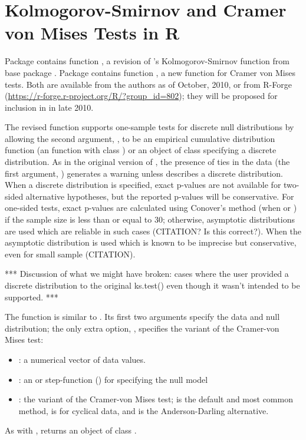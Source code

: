 \documentclass[article]{jss}
\begin{document}
\section{Kolmogorov-Smirnov and Cramer von Mises Tests in R}

Package  contains function , a revision of
's Kolmogorov-Smirnov function  from base
package .
Package  contains function , a new
function for Cramer von Mises tests.  Both are available from the authors
as of October, 2010,
or from R-Forge (\url{https://r-forge.r-project.org/R/?group_id=802});
they will be proposed for inclusion in  in late 2010.

The revised  function supports one-sample tests for discrete
null distributions by allowing the second argument, , to be
an empirical cumulative distribution function (an  function
with class ) or an object of class  specifying
a discrete distribution.  As in the original version of ,
the presence of ties in the data (the first argument, ) generates a
warning unless  describes a discrete distribution.  When a discrete
distribution is specified, exact p-values are not available for 
two-sided alternative hypotheses, but the reported p-values will be
conservative.  For one-sided tests,
exact p-values are calculated using Conover's
method (when  or )
if the sample size is less than or equal to 30; otherwise, asymptotic distributions
are used which are reliable in such cases (CITATION? Is this correct?).
When  the asymptotic distribution is used which is known
to be imprecise but conservative, even for small sample (CITATION).

*** Discussion of what we might have broken: cases where the user
provided a discrete distribution to the original ks.test() even though
it wasn't intended to be supported. ***

The function  is similar to .  Its first two
arguments specify the data and null distribution; the only extra option,
, specifies the variant of the Cramer-von Mises test:
\begin{itemize}
\item {}: a numerical vector of data values.
\item {}: an  or step-function () for specifying
the null model
\item {}: the variant of the Cramer-von Mises test; 
is the default and most common method,  is for cyclical data,
and  is the Anderson-Darling alternative.
\end{itemize}
As with ,  returns an object of class 
.
\end{document}
